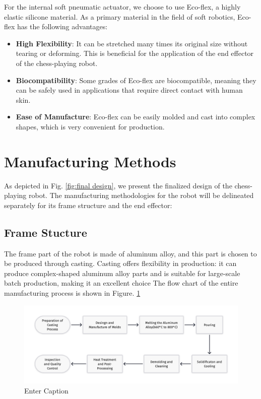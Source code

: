 \documentclass[10pt, a4paper, twocolumn]{article}
\begin{document}
For the internal soft pneumatic actuator, we choose to use Eco-flex, a highly elastic silicone material. As a primary material in the field of soft robotics, Eco-flex has the following advantages:
\begin{itemize}
    \item \textbf{High Flexibility}: It can be stretched many times its original size without tearing or deforming. This is beneficial for the application of the end effector of the chess-playing robot.
    \item \textbf{Biocompatibility}: Some grades of Eco-flex are biocompatible, meaning they can be safely used in applications that require direct contact with human skin.
    \item \textbf{Ease of Manufacture}: Eco-flex can be easily molded and cast into complex shapes, which is very convenient for production. 
\end{itemize}

\section{Manufacturing Methods}

As depicted in Fig. \ref{fig:final design}, we present the finalized design of the chess-playing robot. The manufacturing methodologies for the robot will be delineated separately for its frame structure and the end effector:

\subsection{Frame Stucture}
The frame part of the robot is made of aluminum alloy, and this part is chosen to be produced through casting. Casting offers flexibility in production: it can produce complex-shaped aluminum alloy parts and is suitable for large-scale batch production, making it an excellent choice
The flow chart of the entire manufacturing process is shown in Figure. \ref{fig:Casting process for frame structures}

\begin{figure}
        \centering
        \includegraphics[width=1\linewidth]{casting.png}
        \caption{Enter Caption}
        \label{fig:Casting process for frame structures}
\end{figure}
\end{document}
